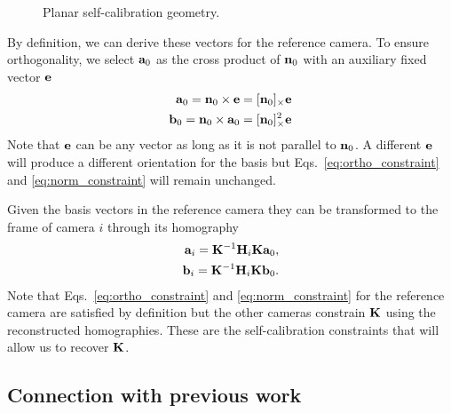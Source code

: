 \documentclass[10pt,twocolumn,letterpaper]{article}
\begin{document}
\begin{figure}
\centering

\caption{Planar self-calibration geometry.}
\label{fig:planar_structure}
\end{figure}

By definition, we can derive these vectors for the reference camera. To ensure orthogonality, we select $\mathbf{a}_0$ as the cross product of $\mathbf{n}_0$ with an auxiliary fixed vector $\mathbf{e}$
\begin{align}
\mathbf{a}_0 = \mathbf{n}_0 \times \mathbf{e} = [\mathbf{n}_0]_\times \mathbf{e} \\
\mathbf{b}_0 = \mathbf{n}_0 \times \mathbf{a}_0 = [\mathbf{n}_0]_\times^2 \mathbf{e}
\end{align}
Note that $\mathbf{e}$ can be any vector as long as it is not parallel to $\mathbf{n}_0$. A different $\mathbf{e}$ will produce a different orientation for the basis but Eqs.~\eqref{eq:ortho_constraint} and \eqref{eq:norm_constraint} will remain unchanged.

Given the basis vectors in the reference camera they can be transformed to the frame of camera $i$ through its homography
\begin{align}
\mathbf{a}_i = \mathbf{K}^{-1} \mathbf{H}_i \mathbf{K} \mathbf{a}_0, \\
\mathbf{b}_i = \mathbf{K}^{-1} \mathbf{H}_i \mathbf{K} \mathbf{b}_0.
\end{align}
%
Note that Eqs.~\eqref{eq:ortho_constraint} and \eqref{eq:norm_constraint} for the reference camera are satisfied by definition but the other cameras constrain $\mathbf{K}$ using the reconstructed homographies. These are the self-calibration constraints that will allow us to recover $\mathbf{K}$.

\subsection{Connection with previous work}
\label{sec:calib:connection}
\end{document}
